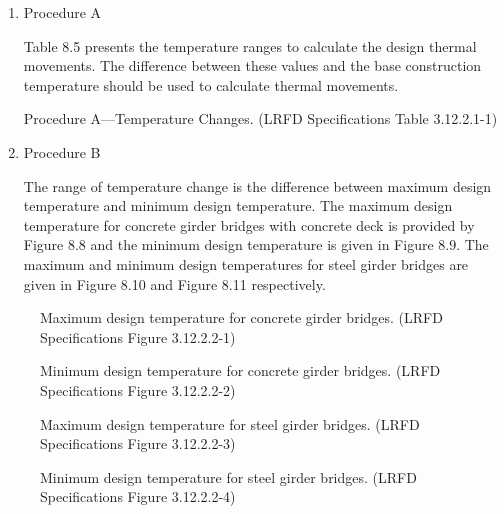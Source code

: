 \begin{enumerate}
  \item Procedure A \par
  Table 8.5 presents the temperature ranges to calculate the design thermal movements. The difference between
these values and the base construction temperature should be used to calculate thermal movements.

  \begin{table}
    \caption{Procedure A—Temperature Changes. (LRFD Specifications Table 3.12.2.1-1)}\label{tab:procedure-A}
  \end{table}
  \item Procedure B \par
  The range of temperature change is the difference between maximum design temperature and minimum design
  temperature. The maximum design temperature for concrete girder bridges with concrete deck is provided by Figure
  8.8 and the minimum design temperature is given in Figure 8.9. The maximum and minimum design temperatures for
  steel girder bridges are given in Figure 8.10 and Figure 8.11 respectively.
\end{enumerate}

\begin{figure}
  \caption{Maximum design temperature for concrete girder bridges. (LRFD Specifications Figure 3.12.2.2-1)}
  \label{fig:max-design-temperature-concrete}
\end{figure}

\begin{figure}
  \caption{Minimum design temperature for concrete girder bridges. (LRFD Specifications Figure 3.12.2.2-2)}
  \label{fig:min-design-temperature-concrete}
\end{figure}

\begin{figure}
  \caption{Maximum design temperature for steel girder bridges. (LRFD Specifications Figure 3.12.2.2-3)}
  \label{fig:max-design-temperature-steel}
\end{figure}

\begin{figure}
  \caption{Minimum design temperature for steel girder bridges. (LRFD Specifications Figure 3.12.2.2-4)}
  \label{fig:min-design-temperature-steel}
\end{figure}


